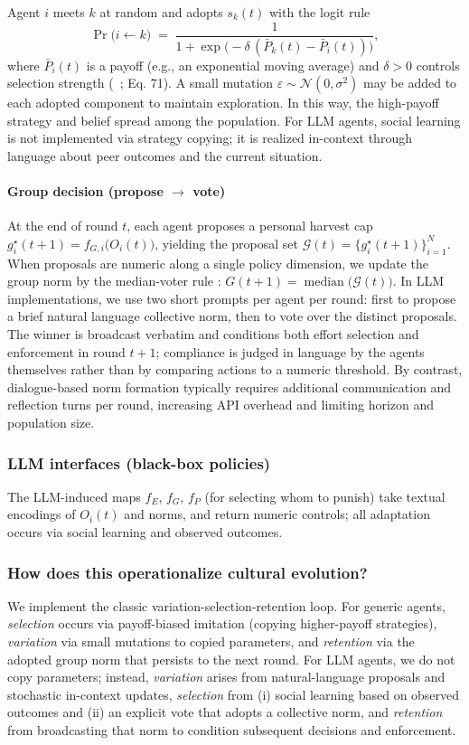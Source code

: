 \documentclass[sigconf]{aamas}
\begin{document}
Agent $i$ meets $k$ at random and adopts $s_k(t)$ with the logit rule
\[
\Pr\big(i \leftarrow k \big)\;=\;\frac{1}{1+\exp\!\big(-\delta\,(\bar P_k(t)-\bar P_i(t))\big)},
\]
where $\bar P_i(t)$ is a payoff (e.g., an exponential moving average) and $\delta>0$ controls selection strength (~\cite{szabo2007evolutionary}; Eq. 71). 
A small mutation $\varepsilon \sim \mathcal{N}(0,\sigma^2)$ may be added to each adopted component to maintain exploration.
In this way, the high-payoff strategy and belief spread among the population.
For LLM agents, social learning is not implemented via strategy copying; it is realized in-context through language about peer outcomes and the current situation. 

\paragraph{Group decision (propose $\to$ vote)}
At the end of round $t$, each agent proposes a personal harvest cap
$g_i^{\star}(t{+}1)=f_{G, i}\!\big(O_i(t)\big)$, yielding the proposal set
$\mathcal{G}(t)=\{g_i^{\star}(t{+}1)\}_{i=1}^N$. When proposals are numeric along a single policy dimension, we update the group norm by the median-voter rule \citep{black1948rationale}:
$G(t{+}1)=\operatorname{median}\!\big(\mathcal{G}(t)\big)$. 
In LLM implementations, we use two short prompts per agent per round: first to propose a brief natural language collective norm, then to vote over the distinct proposals. 
The winner is broadcast verbatim and conditions both effort selection and enforcement in round $t{+}1$; compliance is judged in language by the agents themselves rather than by comparing actions to a numeric threshold.
By contrast, dialogue-based norm formation typically requires additional communication and reflection turns per round, increasing API overhead and limiting horizon and population size.

\subsubsection{\textbf{LLM interfaces (black-box policies)}}
The LLM-induced maps $f_E$, $f_G$, $f_P$ (for selecting whom to punish) take textual encodings of $O_i(t)$ and norms, and return numeric controls; all adaptation occurs via social learning and observed outcomes.

\subsubsection{\textbf{How does this operationalize cultural evolution?}}
We implement the classic variation-selection-retention loop. 
For generic agents, \emph{selection} occurs via payoff-biased imitation (copying higher-payoff strategies), \emph{variation} via small mutations to copied parameters, and \emph{retention} via the adopted group norm that persists to the next round.
For LLM agents, we do not copy parameters; instead, \emph{variation} arises from natural-language proposals and stochastic in-context updates, \emph{selection} from (i) social learning based on observed outcomes and (ii) an explicit vote that adopts a collective norm, and \emph{retention} from broadcasting that norm to condition subsequent decisions and enforcement. 
\end{document}
